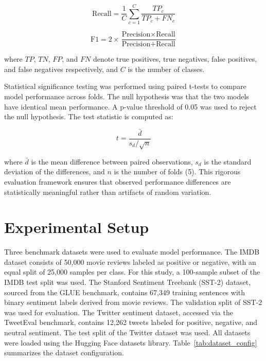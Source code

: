 \documentclass[conference]{IEEEtran}
\begin{document}
\begin{equation}
\text{Recall} = \frac{1}{C} \sum_{c=1}^{C} \frac{TP_c}{TP_c + FN_c}
\end{equation}

\begin{equation}
\text{F1} = 2 \times \frac{\text{Precision} \times \text{Recall}}{\text{Precision} + \text{Recall}}
\end{equation}

where $TP$, $TN$, $FP$, and $FN$ denote true positives, true negatives, false positives, and false negatives respectively, and $C$ is the number of classes.

Statistical significance testing was performed using paired t-tests to compare model performance across folds. The null hypothesis was that the two models have identical mean performance. A p-value threshold of 0.05 was used to reject the null hypothesis. The test statistic is computed as:

\begin{equation}
t = \frac{\bar{d}}{s_d / \sqrt{n}}
\end{equation}

where $\bar{d}$ is the mean difference between paired observations, $s_d$ is the standard deviation of the differences, and $n$ is the number of folds (5). This rigorous evaluation framework ensures that observed performance differences are statistically meaningful rather than artifacts of random variation.

\section{Experimental Setup}

Three benchmark datasets were used to evaluate model performance. The IMDB dataset consists of 50,000 movie reviews labeled as positive or negative, with an equal split of 25,000 samples per class. For this study, a 100-sample subset of the IMDB test split was used. The Stanford Sentiment Treebank (SST-2) dataset, sourced from the GLUE benchmark, contains 67,349 training sentences with binary sentiment labels derived from movie reviews. The validation split of SST-2 was used for evaluation. The Twitter sentiment dataset, accessed via the TweetEval benchmark, contains 12,262 tweets labeled for positive, negative, and neutral sentiment. The test split of the Twitter dataset was used. All datasets were loaded using the Hugging Face datasets library. Table~\ref{tab:dataset_config} summarizes the dataset configuration.
\end{document}
